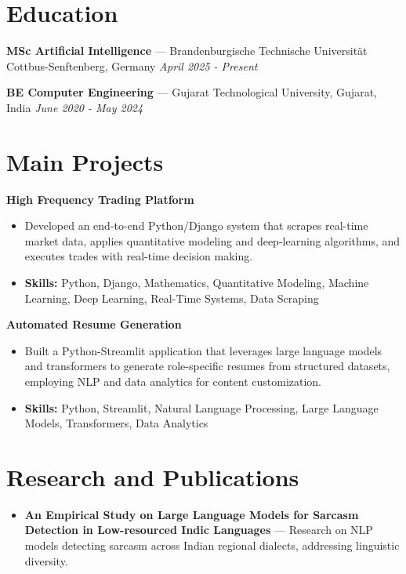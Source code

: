 \documentclass[a4paper,10pt]{article}
\begin{document}
\section*{Education}
\textbf{MSc Artificial Intelligence} — Brandenburgische Technische Universität Cottbus-Senftenberg, Germany \hfill \textit{April 2025 - Present}\par
\vspace{1.5pt}
\textbf{BE Computer Engineering} — Gujarat Technological University, Gujarat, India \hfill \textit{June 2020 - May 2024}\par

\section*{Main Projects}
\textbf{High Frequency Trading Platform}\par
\vspace{1pt}
\begin{itemize}
  \item Developed an end-to-end Python/Django system that scrapes real-time market data, applies quantitative modeling and deep-learning algorithms, and executes trades with real-time decision making.
  \item \textbf{Skills:} Python, Django, Mathematics, Quantitative Modeling, Machine Learning, Deep Learning, Real-Time Systems, Data Scraping
\end{itemize}
\vspace{3pt}
\textbf{Automated Resume Generation}\par
\vspace{1pt}
\begin{itemize}
  \item Built a Python-Streamlit application that leverages large language models and transformers to generate role-specific resumes from structured datasets, employing NLP and data analytics for content customization.
  \item \textbf{Skills:} Python, Streamlit, Natural Language Processing, Large Language Models, Transformers, Data Analytics
\end{itemize}

\section*{Research and Publications}
\begin{itemize}
\item \textbf{An Empirical Study on Large Language Models for Sarcasm Detection in Low-resourced Indic Languages} — Research on NLP models detecting sarcasm across Indian regional dialects, addressing linguistic diversity.
\end{itemize}
\end{document}
